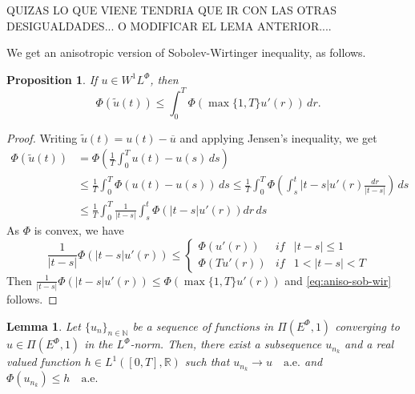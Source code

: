\documentclass[twoside]{article}
\newtheorem{lem}[thm]{Lemma}
\newtheorem{prop}[thm]{Proposition}
\theoremstyle{remark}
\newcommand{\lphi}{L^{\Phi}}
\newcommand{\ephi}{E^{\Phi}}
\newcommand{\wphi}{W^{1}\lphi}
\newcommand{\rr}{\mathbb{R}}
\renewcommand{\leq}{\leqslant}
\begin{document}
QUIZAS LO QUE VIENE TENDRIA QUE IR CON LAS OTRAS DESIGUALDADES... O MODIFICAR EL LEMA ANTERIOR....

We get an anisotropic version of Sobolev-Wirtinger inequality, as follows.
 
\begin{prop}
If  $u \in \wphi$, then 
\begin{equation}\label{eq:aniso-sob-wir}
\Phi(\tilde{u}(t))\leq \int_0^T \Phi(\max\{1,T\}u'(r))\,dr.
\end{equation}
\end{prop}

\begin{proof}
Writing $\tilde{u}(t)=u(t)-\overline{u}$ and applying Jensen's inequality, we get
\begin{equation*}
\begin{split}
\Phi(\tilde{u}(t))&=\Phi\left(\frac{1}{T}\int_0^T u(t)-u(s)\,ds\right)\\
&\leq\frac{1}{T}\int_0^T \Phi(u(t)-u(s))\,ds
\leq \frac{1}{T}\int_0^T \Phi\left(\int_s^t |t-s| u'(r)\frac{dr}{|t-s|}\right)\,ds\\
&\leq 
\frac{1}{T}\int_0^T \frac{1}{|t-s|} \int_s^t\Phi\left(|t-s| u'(r)\right)dr\,ds
\end{split}
\end{equation*}
As $\Phi$ is convex, we have
\[
\frac{1}{|t-s|}\Phi(|t-s|u'(r))\leq 
\left\{\begin{array}{lll}
\Phi(u'(r))&if&|t-s|\leq 1
\\
\Phi(T u'(r))&if&1<|t-s|<T
\end{array}
\right.
\]
Then
$\frac{1}{|t-s|}\Phi\left(|t-s| u'(r)\right)\leq \Phi(\max\{1,T\} u'(r))$ and \eqref{eq:aniso-sob-wir} follows.
\end{proof}





\begin{lem}\label{segundo lema}
Let  $\{{u}_n\}_{n\in \mathbb{N}}$ be a sequence of  functions in $\Pi(\ephi,1)$ converging to  ${u}\in \Pi(\ephi,1)$  in the $\lphi$-norm. Then, there exist a subsequence
${u}_{n_k}$ and a real valued function $h\in L^1([0,T],\rr)$ such that ${u}_{n_k}\rightarrow {u} \quad\text{a.e.}$ and $\Phi({u}_{n_k})\leq h\quad\text{a.e.}$
\end{lem}
\end{document}
